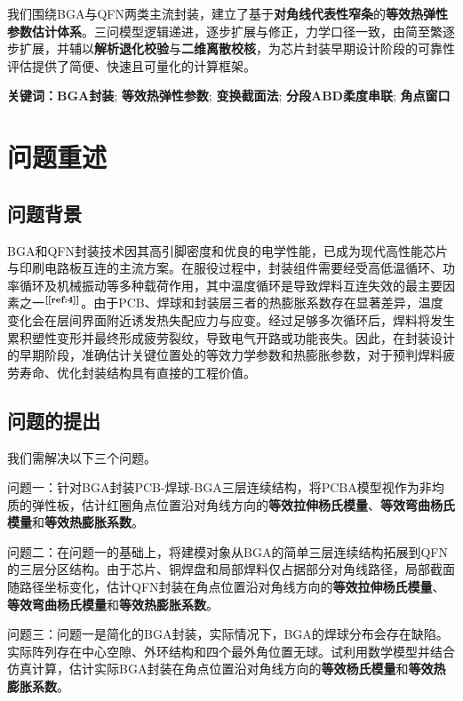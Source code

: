 \documentclass[draft,12pt,a4paper]{ctexart}
\theoremstyle{definition}
\begin{document}
我们围绕BGA与QFN两类主流封装，建立了基于\textbf{对角线代表性窄条}的\textbf{等效热弹性参数估计体系}。三问模型逻辑递进，逐步扩展与修正，力学口径一致，由简至繁逐步扩展，并辅以\textbf{解析退化校验}与\textbf{二维离散校核}，为芯片封装早期设计阶段的可靠性评估提供了简便、快速且可量化的计算框架。

\noindent\textbf{关键词：}\textbf{BGA封装}; \textbf{等效热弹性参数}; \textbf{变换截面法}; \textbf{分段ABD柔度串联}; \textbf{角点窗口}
\newpage

\section{问题重述}
\subsection{问题背景}

BGA和QFN封装技术因其高引脚密度和优良的电学性能，已成为现代高性能芯片与印刷电路板互连的主流方案。在服役过程中，封装组件需要经受高低温循环、功率循环及机械振动等多种载荷作用，其中温度循环是导致焊料互连失效的最主要因素之一$^{\textbf{[\ref{ref:4}]}}$。由于PCB、焊球和封装层三者的热膨胀系数存在显著差异，温度变化会在层间界面附近诱发热失配应力与应变。经过足够多次循环后，焊料将发生累积塑性变形并最终形成疲劳裂纹，导致电气开路或功能丧失。因此，在封装设计的早期阶段，准确估计关键位置处的等效力学参数和热膨胀参数，对于预判焊料疲劳寿命、优化封装结构具有直接的工程价值。


\subsection{问题的提出}

我们需解决以下三个问题。

问题一：针对BGA封装PCB-焊球-BGA三层连续结构，将PCBA模型视作为非均质的弹性板，估计红圈角点位置沿对角线方向的\textbf{等效拉伸杨氏模量}、\textbf{等效弯曲杨氏模量}和\textbf{等效热膨胀系数}。

问题二：在问题一的基础上，将建模对象从BGA的简单三层连续结构拓展到QFN的三层分区结构。由于芯片、铜焊盘和局部焊料仅占据部分对角线路径，局部截面随路径坐标变化，估计QFN封装在角点位置沿对角线方向的\textbf{等效拉伸杨氏模量}、\textbf{等效弯曲杨氏模量}和\textbf{等效热膨胀系数}。

问题三：问题一是简化的BGA封装，实际情况下，BGA的焊球分布会存在缺陷。实际阵列存在中心空隙、外环结构和四个最外角位置无球。试利用数学模型并结合仿真计算，估计实际BGA封装在角点位置沿对角线方向的\textbf{等效杨氏模量}和\textbf{等效热膨胀系数}。
\end{document}
